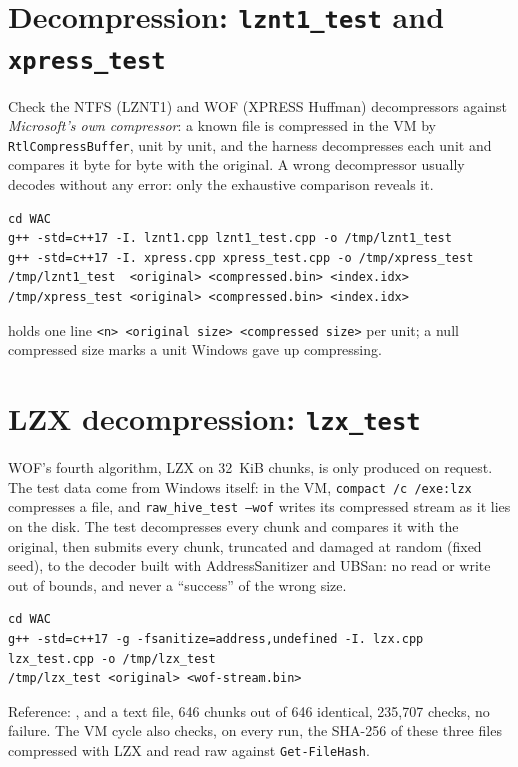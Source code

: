 \documentclass[11pt,a4paper,oneside]{report}
\begin{document}
\section{Decompression: \texttt{lznt1\_test} and \texttt{xpress\_test}}

Check the NTFS (LZNT1) and WOF (XPRESS Huffman) decompressors against
\emph{Microsoft's own compressor}: a known file is compressed in the VM by
\texttt{RtlCompressBuffer}, unit by unit, and the harness decompresses each unit
and compares it byte for byte with the original. A wrong decompressor usually
decodes without any error: only the exhaustive comparison reveals it.

\begin{lstlisting}
cd WAC
g++ -std=c++17 -I. lznt1.cpp lznt1_test.cpp -o /tmp/lznt1_test
g++ -std=c++17 -I. xpress.cpp xpress_test.cpp -o /tmp/xpress_test
/tmp/lznt1_test  <original> <compressed.bin> <index.idx>
/tmp/xpress_test <original> <compressed.bin> <index.idx>
\end{lstlisting}

 holds one line \texttt{<n> <original size> <compressed
size>} per unit; a null compressed size marks a unit Windows gave up
compressing.

\section{LZX decompression: \texttt{lzx\_test}}

WOF's fourth algorithm, LZX on 32~KiB chunks, is only produced on request. The
test data come from Windows itself: in the VM, \texttt{compact /c /exe:lzx}
compresses a file, and \texttt{raw\_hive\_test --wof} writes its compressed
stream as it lies on the disk. The test decompresses every chunk and compares it
with the original, then submits every chunk, truncated and damaged at random
(fixed seed), to the decoder built with AddressSanitizer and UBSan: no read or
write out of bounds, and never a ``success'' of the wrong size.

\begin{lstlisting}
cd WAC
g++ -std=c++17 -g -fsanitize=address,undefined -I. lzx.cpp lzx_test.cpp -o /tmp/lzx_test
/tmp/lzx_test <original> <wof-stream.bin>
\end{lstlisting}

Reference: ,  and a text file,
646 chunks out of 646 identical, 235,707 checks, no failure. The VM cycle also
checks, on every run, the SHA-256 of these three files compressed with LZX and
read raw against \texttt{Get-FileHash}.
\end{document}
